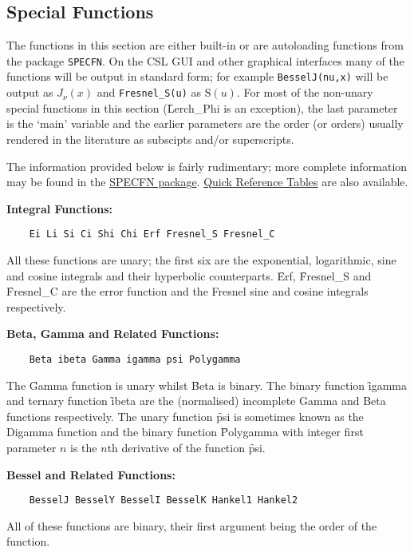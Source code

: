 \subsection{Special Functions}
The functions in this section are either built-in or are autoloading
functions from the package \texttt{SPECFN}. On the CSL GUI and other graphical
interfaces many of the functions will be output in standard form; for example
\texttt{BesselJ(nu,x)} will be output as $J_\nu(x)$ and \texttt{Fresnel\_S(u)}
as $\mathrm{S}(u)$. For most of the non-unary special functions in this
section (\f{Lerch\_Phi} is an exception), the last parameter is the `main'
variable and the earlier parameters are the order (or orders)
usually rendered in the literature as subscipts and/or superscripts.

The information provided below is fairly rudimentary; more complete
information may be found in the \hyperlink{SPECFNS}{SPECFN package}.
\hyperlink{SPECFNTAB1}{Quick Reference Tables} are also available.

 
\textbf{Integral Functions:}
\begin{verbatim}
    Ei Li Si Ci Shi Chi Erf Fresnel_S Fresnel_C
\end{verbatim}
All these functions are unary;
the first six are the exponential, logarithmic, sine and
cosine integrals and their hyperbolic counterparts. \f{Erf},
\f{Fresnel\_S} and \f{Fresnel\_C} are the error function and the Fresnel
sine and cosine integrals respectively.

\textbf{Beta, Gamma and Related Functions:}
\begin{verbatim}
    Beta ibeta Gamma igamma psi Polygamma
\end{verbatim}
The \f{Gamma} function is unary whilst \f{Beta} is binary.
The binary function \f{igamma} and ternary function \f{ibeta}
are the (normalised) incomplete Gamma and Beta functions respectively.
The unary function \f{psi} is sometimes known as the Digamma function and
the binary function \f{Polygamma} with integer first parameter $n$ is the
$n$th derivative of the function \f{psi}.

\textbf{Bessel and Related Functions:}
\begin{verbatim}
    BesselJ BesselY BesselI BesselK Hankel1 Hankel2
\end{verbatim}
All of these functions are binary, their first argument being the
order of the function.

